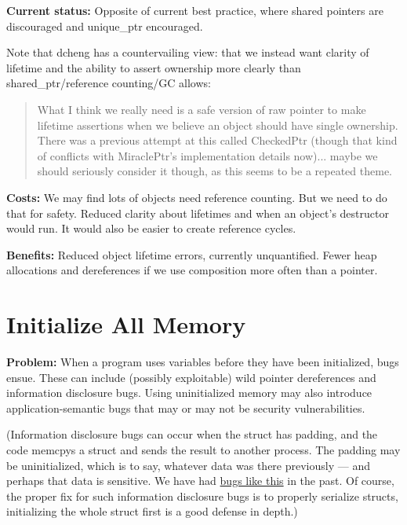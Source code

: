 \documentclass[a4paper,12pt,notitlepage,twoside,openright]{article}
\newcommand{\uline}[1]{#1}
\begin{document}
{\textbf{Current status:} Opposite of current best practice, where shared
pointers are discouraged and unique\_ptr encouraged.

Note that dcheng has a countervailing view: that we instead want clarity
of lifetime and the ability to assert ownership more clearly than
shared\_ptr/reference counting/GC allows:

\begin{quote}
What I think we really need is a safe version of raw pointer to make
lifetime assertions when we believe an object should have single
ownership. There was a previous attempt at this called CheckedPtr
(though that kind of conflicts with MiraclePtr's implementation details
now)... maybe we should seriously consider it though, as this seems to
be a repeated theme.
\end{quote}

\textbf{Costs:} We may find lots of objects need reference counting. But
we need to do that for safety. Reduced clarity about lifetimes and when
an object's destructor would run. It would also be easier to create
reference cycles.

\textbf{Benefits:} Reduced object lifetime errors, currently
unquantified. Fewer heap allocations and dereferences if we use
composition more often than a pointer.

\section{Initialize All Memory}

\textbf{Problem:} When a program uses variables before they have been
initialized, bugs ensue. These can include (possibly exploitable) wild
pointer dereferences and information disclosure bugs. Using
uninitialized memory may also introduce application-semantic bugs that
may or may not be security vulnerabilities.

(Information disclosure bugs can occur when the struct has padding, and
the code memcpys a struct and sends the result to another process. The
padding may be uninitialized, which is to say, whatever data was there
previously --- and perhaps that data is sensitive. We have
had \href{https://www.google.com/url?q=https://bugs.chromium.org/p/chromium/issues/detail?id\%3D765512\&sa=D\&source=editors\&ust=1631944129080000\&usg=AOvVaw1rvWaqATRYqrayvsC28EmW}{\uline{bugs
like this}} in the past. Of course, the proper fix for such information
disclosure bugs is to properly serialize structs, initializing the
whole struct first is a good defense in depth.)

}
\end{document}
